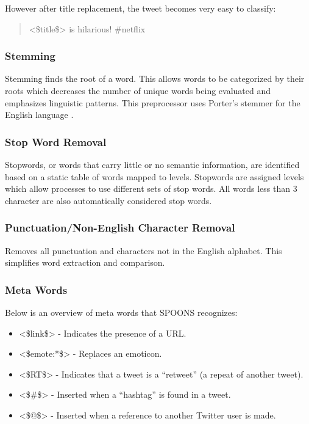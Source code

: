 \documentclass[12pt]{ucthesis}
\begin{document}
However after title replacement, the tweet becomes very easy to classify:

\begin{quote}
<\$title\$> is hilarious!  \#netflix
\end{quote}

\subsubsection{Stemming}
\label{class-filter-stemming}
Stemming finds the root of a word. This allows words to be categorized by their roots which
decreases the number of unique words being evaluated and emphasizes linguistic patterns.
This preprocessor uses Porter's stemmer for the English language \cite{porters}.

\subsubsection{Stop Word Removal}
\label{class-filter-stopword}
Stopwords, or words that carry little or no semantic information, are identified based
on a static table of words mapped to levels. Stopwords are assigned levels which allow
processes to use different sets of stop words. All words less than 3 character are also
automatically considered stop words.

\subsubsection{Punctuation/Non-English Character Removal}
\label{class-filter-noneng}
Removes all punctuation and
characters not in the English alphabet. This simplifies word extraction and
comparison.

\subsubsection{Meta Words}
\label{class-filter-meta}
Below is an overview of meta words that SPOONS recognizes:
\begin{itemize}
   \item <\$link\$> - Indicates the presence of a URL.
   \item <\$emote:*\$> - Replaces an emoticon.
   \item <\$RT\$> - Indicates that a tweet is a ``retweet'' (a repeat of another tweet).
   \item <\$\#\$> - Inserted when a ``hashtag'' is found in a tweet.
   \item <\$@\$> - Inserted when a reference to another Twitter user is made.
\end{itemize}
\end{document}
